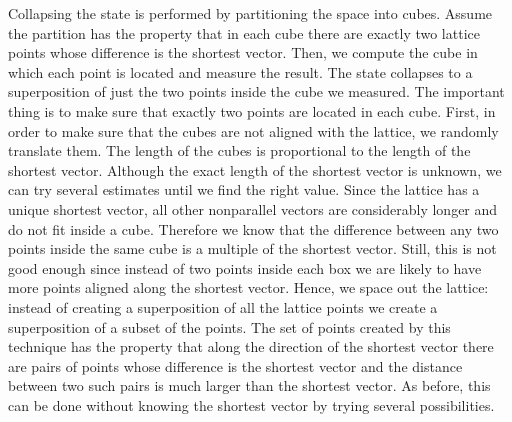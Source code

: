 \documentclass[11pt]{article}
\begin{document}
Collapsing the state is performed by partitioning the space into cubes. Assume the partition has the property that in
each cube there are exactly two lattice points whose difference is the shortest vector. Then, we compute the cube in
which each point is located and measure the result. The state collapses to a superposition of just the two points
inside the cube we measured. The important thing is to make sure that exactly two points are located in each cube.
First, in order to make sure that the cubes are not aligned with the lattice, we randomly translate them. The length of
the cubes is proportional to the length of the shortest vector. Although the exact length of the shortest vector is
unknown, we can try several estimates until we find the right value. Since the lattice has a unique shortest vector,
all other nonparallel vectors are considerably longer and do not fit inside a cube. Therefore we know that the
difference between any two points inside the same cube is a multiple of the shortest vector. Still, this is not good
enough since instead of two points inside each box we are likely to have more points aligned along the shortest vector.
Hence, we space out the lattice: instead of creating a superposition of all the lattice points we create a
superposition of a subset of the points. The set of points created by this technique has the property that along the
direction of the shortest vector there are pairs of points whose difference is the shortest vector and the distance
between two such pairs is much larger than the shortest vector. As before, this can be done without knowing the
shortest vector by trying several possibilities.
\end{document}
